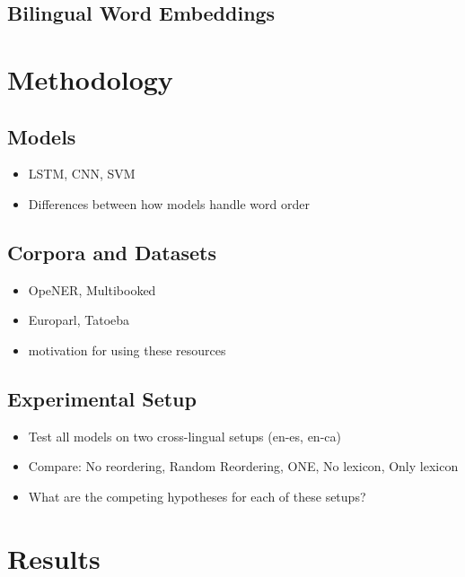 \documentclass[11pt,a4paper]{article}
\begin{document}
\cite{Mohammad2015b}

\subsection{Bilingual Word Embeddings}



\section{Methodology}

\subsection{Models}

\begin{itemize}
\item LSTM, CNN, SVM
\item Differences between how models handle word order
\end{itemize}

\subsection{Corpora and Datasets}

\begin{itemize}
\item OpeNER, Multibooked
\item Europarl, Tatoeba
\item motivation for using these resources
\end{itemize}

\subsection{Experimental Setup}

\begin{itemize}
\item Test all models on two cross-lingual setups (en-es, en-ca)
\item Compare: No reordering, Random Reordering, ONE, No lexicon, Only lexicon
\item What are the competing hypotheses for each of these setups?
\end{itemize}

\section{Results}
\end{document}
